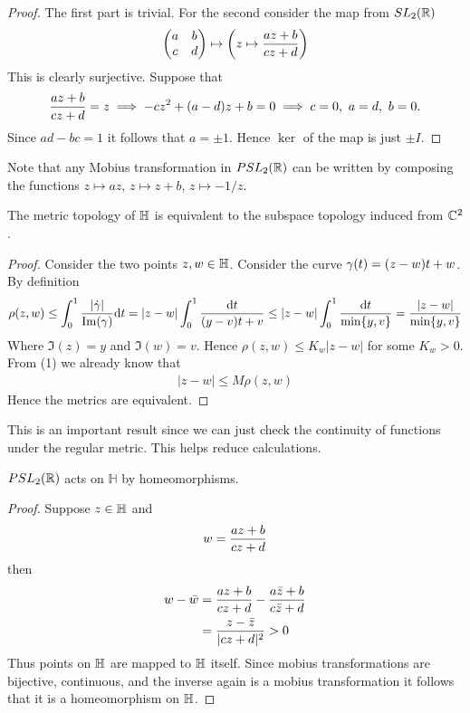 \begin{proof}
  The first part is trivial. For the second consider the map from $SL_2(\mathbb{R})$
  \begin{align*}
    \begin{pmatrix}
      a&b\\c&d
    \end{pmatrix} \mapsto \left(z\mapsto \frac{az+b}{cz+d}\right)
  \end{align*}
  This is clearly surjective. Suppose that
  \begin{align*}
    \f{az+b}{cz+d} = z \implies -cz^2 + (a-d)z + b = 0 \implies c = 0,\ a=d,\ b=0.
  \end{align*}
  Since $ad-bc=1$ it follows that $a = \pm 1$. Hence $\ker$ of the map is just $\pm I$.
\end{proof}
Note that any Mobius transformation in $PSL_2(\mathbb{R})$ can be written by composing the functions $z\mapsto az$, $z\mapsto z+b$, $z\mapsto -1/z$.
\begin{proposition}
  The metric topology of $\mathbb{H}$ is equivalent to the subspace topology induced from $\mathbb{C}^2$.
\end{proposition}
\begin{proof}
  Consider the two points $z,w\in\mathbb{H}$. Consider the curve $\gamma(t) = (z-w)t + w$. By definition
  \begin{align*}
    \rho(z,w) \leq \int^1_0 \frac{|\dot{\gamma}|}{\Im(\gamma)} \dd t = |z-w| \int^1_0 \frac{\dd t}{(y-v)t+v} \leq |z-w| \int^1_0 \frac{\dd t}{\min\{y,v\}} = \frac{|z-w|}{\min\{y,v\}}  
  \end{align*}
  Where $\Im(z) = y$ and $\Im(w) = v$. Hence $\rho(z,w) \leq K_w |z-w|$ for some $K_w>0$. From (1) we already know that
  \begin{align*}
    |z-w| \leq M \rho(z,w) 
  \end{align*}
  Hence the metrics are equivalent. 
\end{proof}
This is an important result since we can just check the continuity of functions under the regular metric. This helps reduce calculations.
\begin{theorem}
  $PSL_2(\mathbb{R})$ acts on $ \mathbb{H}$ by homeomorphisms.
\end{theorem}
\begin{proof}
  Suppose $z\in\mathbb{H}$ and
  \begin{align*}
    w = \frac{az+b}{cz+d}
  \end{align*}
  then
  \begin{align*}
    w-\bar{w} &= \frac{az+b}{cz+d} - \frac{a\bar{z}+b}{c\bar{z}+d}\\
              &= \frac{z-\bar{z}}{|cz+d|^2} > 0
  \end{align*}
  Thus points on $\mathbb{H}$ are mapped to $\mathbb{H}$ itself. Since mobius transformations are bijective, continuous, and the inverse again is a mobius transformation it follows that it is a homeomorphism on $\mathbb{H}$. 
\end{proof}
